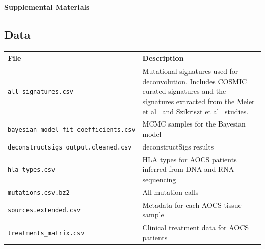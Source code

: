 
\pagebreak
\begin{center}
\textbf{\large Supplemental Materials}
\end{center}

\setcounter{equation}{0}
\setcounter{figure}{0}
\setcounter{table}{0}
\makeatletter
\renewcommand{\theequation}{S\arabic{equation}}
\renewcommand{\thefigure}{S\arabic{figure}}

\subsection*{Data}
\begin{center}
    \begin{tabular}{ | l | p{5cm} |}
    \hline
    File & Description \\ \hline
    \texttt{all\_signatures.csv} & Mutational signatures used for deconvolution. Includes COSMIC curated signatures and the signatures extracted from the Meier et al~\cite{Meier_2014} and Szikriszt et al~\cite{Szikriszt_2016} studies. \\ \hline
    \texttt{bayesian\_model\_fit\_coefficients.csv} & MCMC samples for the Bayesian model \\ \hline
    \texttt{deconstructsigs\_output.cleaned.csv} & deconstructSigs results \\ \hline
    \texttt{hla\_types.csv} & HLA types for AOCS patients inferred from DNA and RNA sequencing \\ \hline
    \texttt{mutations.csv.bz2} & All mutation calls \\ \hline
    \texttt{sources.extended.csv} & Metadata for each AOCS tissue sample \\ \hline
    \texttt{treatments\_matrix.csv} & Clinical treatment data for AOCS patients \\ \hline
    \end{tabular}
\end{center}


